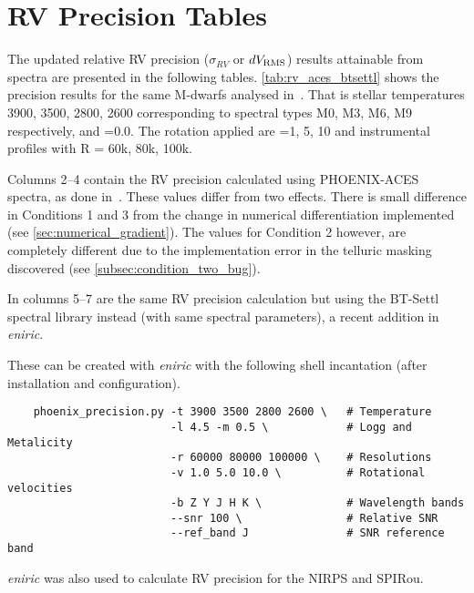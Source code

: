 
\chapter{RV Precision Tables} %

\label{app:nir_prec_amendment}

The updated relative RV precision ($\sigma_{RV}$ or $dV_{\textrm{RMS}}$) results attainable from \nir{} spectra are presented in the following tables.
\cref{tab:rv_aces_btsettl} shows the precision results for the same M-dwarfs analysed in~\citep{figueira_radial_2016}.
That is stellar temperatures 3900, 3500, 2800, 2600\K{} corresponding to spectral types M0, M3, M6, M9 respectively,  and \feh{}=0.0.
The rotation applied are \Vsini{}=1, 5, 10\kmps{} and instrumental profiles with R = 60k, 80k, 100k.

Columns 2--4 contain the RV precision calculated using {PHOENIX-ACES} spectra, as done in~\citet{figueira_radial_2016}.
These values differ from two effects.
There is small difference in Conditions 1 and 3 from the change in numerical differentiation implemented (see \cref{sec:numerical_gradient}).
The values for Condition 2 however, are completely different due to the implementation error in the telluric masking discovered (see \cref{subsec:condition_two_bug}).

In columns 5--7 are the same RV precision calculation but using the {BT-Settl} spectral library instead (with same spectral parameters), a recent addition in \emph{eniric}.


These can be created with \emph{eniric} with the following shell incantation (after installation and configuration).


\begin{lstlisting}
    phoenix_precision.py -t 3900 3500 2800 2600 \   # Temperature
                         -l 4.5 -m 0.5 \            # Logg and Metalicity
                         -r 60000 80000 100000 \    # Resolutions
                         -v 1.0 5.0 10.0 \          # Rotational velocities
                         -b Z Y J H K \             # Wavelength bands
                         --snr 100 \                # Relative SNR
                         --ref_band J               # SNR reference band
\end{lstlisting}


\emph{eniric} was also used to calculate {RV} precision for the {NIRPS} and {SPIRou}.

